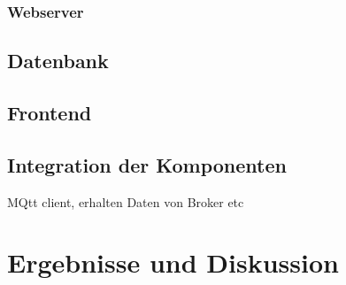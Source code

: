 \documentclass[12pt, letterpaper]{article}
\begin{document}
  \subsubsection{Webserver}
  \subsection{Datenbank}
  \subsection{Frontend}
  \subsection{Integration der Komponenten}
  \par MQtt client, erhalten Daten von Broker etc

\newpage
\section{Ergebnisse und Diskussion}

\newpage
\end{document}

